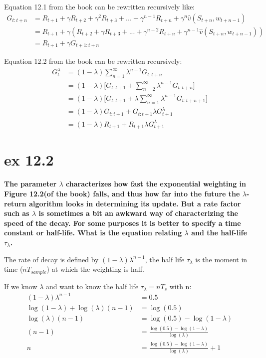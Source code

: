 Equation 12.1 from the book can be rewritten recursively like:
\begin{equation}
\begin{split}
G_{t:t+n} & = R_{t+1} + \gamma R_{t+2} + \gamma^2 R_{t+3} + ... + \gamma^{n-1}R_{t+n} + \gamma^n \hat{v}(S_{t+n}, w_{t+n-1}) \\
& = R_{t+1} + \gamma (R_{t+2} + \gamma R_{t+3} + ... + \gamma^{n-2}R_{t+n} + \gamma^{n-1} \hat{v}(S_{t+n}, w_{t+n-1})) \\
& = R_{t+1} + \gamma G_{t+1:t+n}
\end{split}
\end{equation}

Equation 12.2 from the book can be rewritten recursively:
\begin{equation}
\begin{split}
G_t^{\lambda} & = (1-\lambda)\sum_{n=1}^{\infty} \lambda ^{n-1}G_{t:t+n}\\
& = (1-\lambda)\big[G_{t:t+1} + \sum_{n=2}^{\infty} \lambda^{n-1}G_{t:t+n}\big] \\
& = (1-\lambda)\big[G_{t:t+1} + \lambda \sum_{n=1}^{\infty} \lambda^{n-1}G_{t:t+n+1}\big] \\
& = (1-\lambda)  G_{t:t+1} + G_{t:t+1}\lambda G_{t+1}^{\lambda}  \\
& = (1-\lambda)  R_{t+1} + R_{t+1}\lambda G_{t+1}^{\lambda}  
\end{split}
\end{equation}

\section{ex 12.2}
\textbf{The parameter $\lambda$ characterizes how fast the exponential weighting in Figure 12.2(of the book) falls, and thus how far into the future the $\lambda$-return algorithm looks in determining its update. But a rate factor such as $\lambda$ is sometimes a bit an awkward way of characterizing the speed of the decay. For some purposes it is better to specify a time constant or half-life. What is the equation relating $\lambda$ and the half-life $\tau_{\lambda}$.}

The rate of decay is defined by $(1-\lambda)\lambda^{n-1}$, the half life  $\tau_{\lambda}$ is the moment in time ($n T_{sample}$) at which the weighting is half.

If we know $\lambda$ and want to know the half life $\tau_{\lambda} = n T_s$ with n:
\begin{equation}
\begin{split}
(1-\lambda)\lambda^{n-1} & = 0.5 \\
\log(1-\lambda) + \log(\lambda)(n-1) & = \log(0.5) \\
\log(\lambda)(n-1) & = \log(0.5) - \log(1-\lambda)\\
(n-1) & = \frac{\log(0.5) - \log(1-\lambda)}{\log(\lambda)}\\
n & = \frac{\log(0.5) - \log(1-\lambda)}{\log(\lambda)} + 1\\
\end{split}
\end{equation}

